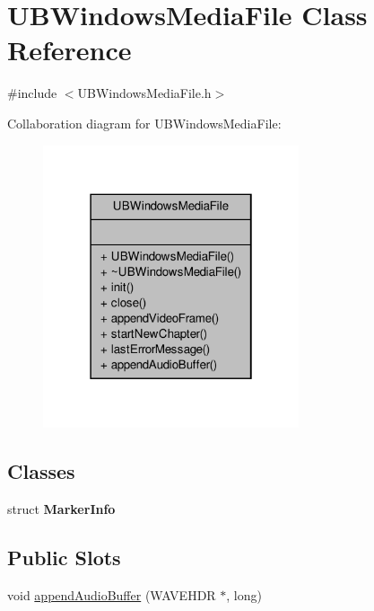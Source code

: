 \hypertarget{class_u_b_windows_media_file}{\section{U\-B\-Windows\-Media\-File Class Reference}
\label{d7/d45/class_u_b_windows_media_file}
}


{\ttfamily \#include $<$U\-B\-Windows\-Media\-File.\-h$>$}



Collaboration diagram for U\-B\-Windows\-Media\-File\-:
\nopagebreak
\begin{figure}[H]
\begin{center}
\leavevmode
\includegraphics[width=214pt]{d8/d8b/class_u_b_windows_media_file__coll__graph}
\end{center}
\end{figure}
\subsection*{Classes}
\begin{DoxyCompactItemize}
\item 
struct {\bfseries Marker\-Info}
\end{DoxyCompactItemize}
\subsection*{Public Slots}
\begin{DoxyCompactItemize}
\item 
void \hyperlink{class_u_b_windows_media_file_a8fb19ef55c2c7b9d7e28b4d6c668100e}{append\-Audio\-Buffer} (W\-A\-V\-E\-H\-D\-R $\ast$, long)
\end{DoxyCompactItemize}

